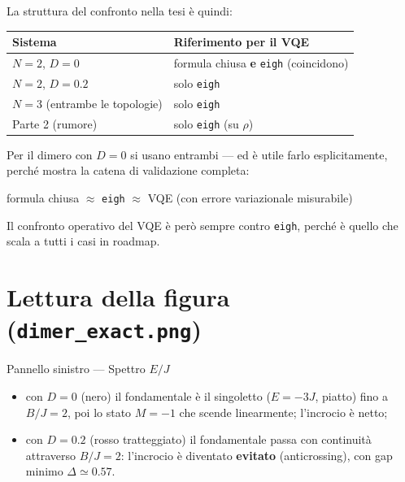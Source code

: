 \documentclass[11pt,a4paper]{article}
\begin{document}
\medskip
\noindent La struttura del confronto nella tesi è quindi:

\begin{center}
\renewcommand{\arraystretch}{1.3}
\begin{tabular}{@{}p{5.4cm}p{6.4cm}@{}}
\toprule
\rowcolor{inkblue!10}
\textbf{Sistema} & \textbf{Riferimento per il VQE}\\
\midrule
$N=2$, $D=0$ & formula chiusa \textbf{e} \texttt{eigh} (coincidono)\\
$N=2$, $D=0.2$ & solo \texttt{eigh}\\
$N=3$ (entrambe le topologie) & solo \texttt{eigh}\\
Parte 2 (rumore) & solo \texttt{eigh} (su $\rho$)\\
\bottomrule
\end{tabular}
\end{center}

Per il dimero con $D=0$ si usano entrambi --- ed è utile farlo
esplicitamente, perché mostra la catena di validazione completa:

\begin{keyeq}
\centering
formula chiusa $\approx$ \texttt{eigh} $\approx$ VQE \quad
(con errore variazionale misurabile)
\end{keyeq}

Il confronto operativo del VQE è però sempre contro \texttt{eigh},
perché è quello che scala a tutti i casi in roadmap.

\section*{Lettura della figura (\texttt{dimer\_exact.png})}

\begin{panelbox}{Pannello sinistro --- Spettro $E/J$}
\begin{itemize}[leftmargin=1.2em, itemsep=0.1em]
\item con $D=0$ (nero) il fondamentale è il singoletto ($E=-3J$, piatto)
fino a $B/J=2$, poi lo stato $M=-1$ che scende linearmente; l'incrocio è
netto;
\item con $D=0.2$ (rosso tratteggiato) il fondamentale passa con
continuità attraverso $B/J=2$: l'incrocio è diventato \textbf{evitato}
(anticrossing), con gap minimo $\Delta \simeq 0.57$.
\end{itemize}
\end{panelbox}
\smallskip
\end{document}
